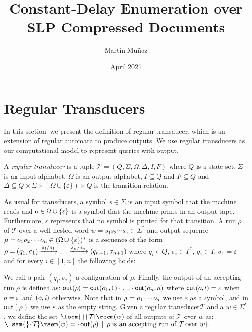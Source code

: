 \documentclass{article}
\title{Constant-Delay Enumeration over SLP Compressed Documents}
\author{Mart\'in Mu\~noz}
\date{April 2021}
\newcommand{\cT}{\mathcal{T}\!}
\newcommand{\oalph}{\Omega}
\newcommand{\qinit}{I}
\newcommand{\eps}{\varepsilon}
\newcommand{\out}{\textsf{out}}
\newcommand{\sem}[1]{{\lsem{}{#1}\rsem}}
\newcommand{\rtname}{regular transducer\xspace}
\newcommand{\rtnames}{regular transducers\xspace}
\DeclareMathOperator{\oout}{%
	\ooalign{\raisebox{0ex}{$o$}\cr\hidewidth\raisebox{.5ex}{\scalebox{.5}{$\ \,  \boldsymbol{\smallsmile}$}}\hidewidth}}%
\DeclareMathOperator{\ooutscr}{\scriptsize{\ooalign{\raisebox{0ex}{$o$}\cr\hidewidth\raisebox{.45ex}{\scalebox{.5}{$\ \,  \boldsymbol{\smallsmile}$}}\hidewidth}}}
\begin{document}
	
	\maketitle
	
	\section{Regular Transducers}
	
	In this section, we present the definition of \rtname, which is an extension of regular automata to produce outputs. We use \rtnames as our computational model to represent queries with output. 
	
	A \emph{\rtname} is a tuple $\cT = (Q, \Sigma, \oalph, \Delta, \qinit, F)$ where $Q$ is a state set, $\Sigma$ is an input alphabet, $\oalph$ is an output alphabet, $\qinit \subseteq Q$ and $F \subseteq Q$ and $\Delta \subseteq Q \times \Sigma \times (\oalph \cup \{\eps\}) \times Q$ is the transition relation.
	
	As usual for transducers, a symbol $s \in \Sigma$ is an input symbol that the machine reads and $\oout \in \oalph \cup \{\eps\}$ is a symbol that the machine prints in an output tape. Furthermore, $\eps$ represents that no symbol is printed for that transition.
	A run $\rho$ of $\cT$ over a well-nested word $w = s_1s_2\cdots s_n \in\Sigma^*$ and output sequence $\mu = \oout_1\!\oout_2\cdots\oout_n \in (\oalph \cup \{\eps\})^*$ is a sequence of the form
	$
	\rho = (q_1, \sigma_1) \xrightarrow{s_1/\!\ooutscr_1} \ldots  \xrightarrow{s_n/\!\ooutscr_n} (q_{n+1}, \sigma_{n+1})
	$
	where $q_i \in Q$, $\sigma_i\in \Gamma^{*}$, $q_1 \in I$, $\sigma_1 = \eps$ and for every $i\in[1,n]$ the following holds:
	
	We call a pair $(q_i, \sigma_i)$ a configuration of $\rho$. 
	Finally, the output of an accepting run $\rho$ is defined as:
	$
	\out(\rho) =  \out(\oout_1,1)\cdot \ldots \cdot \out(\oout_n, n)
	$
	where $\out(\oout, i) = \eps$ when $\oout = \eps$ and $(\oout, i)$ otherwise. Note that in $\mu = \oout_1 \cdots \oout_n$ we use $\eps$ as a symbol, and in $\out(\rho)$ we use $\eps$ as the empty string. Given a \rtname $\cT$ and a $w \in\Sigma^*$, we define the set $\sem{\cT}(w)$ of all outputs of $\cT$ over $w$ as:
	$
	\sem{\cT}(w) = \{ \out(\rho) \, \mid \, \text{$\rho$ is an accepting run of $\cT$ over $w$}\}.
	$
	
\end{document}
